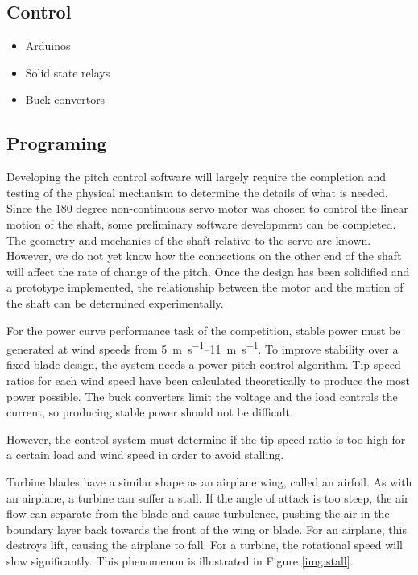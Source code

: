 \documentclass[11pt,letterpaper,conference]{IEEEtran}
\begin{document}
\subsection{Control}

\begin{itemize}
    \item Arduinos
    \item Solid state relays
    \item Buck convertors
\end{itemize}

\subsection{Programing}

Developing the pitch control software will largely require the completion and
testing of the physical mechanism to determine the details of what is needed.
Since the 180 degree non-continuous servo motor was chosen to control the
linear motion of the shaft, some preliminary software development can be
completed. The geometry and mechanics of the shaft relative to the servo are
known. However, we do not yet know how the connections on the other end of the
shaft will affect the rate of change of the pitch. Once the design has been
solidified and a prototype implemented, the relationship between the motor and
the motion of the shaft can be determined experimentally.

For the power curve performance task of the competition, stable power must be
generated at wind speeds from \qtyrange{5}{11}{\m\per\s}. To improve
stability over a fixed blade design, the system needs a power pitch control
algorithm. Tip speed ratios for each wind speed have been calculated
theoretically to produce the most power possible. The buck converters limit the
voltage and the load controls the current, so producing stable power should not
be difficult.



However, the control system
must determine if the tip speed ratio is too high for a certain load and wind
speed in order to avoid stalling.

Turbine blades have a similar shape as an airplane wing, called an airfoil. As
with an airplane, a turbine can suffer a stall. If the angle of attack is too
steep, the air flow can separate from the blade and cause turbulence, pushing
the air in the boundary layer back towards the front of the wing or blade. For
an airplane, this destroys lift, causing the airplane to fall. For a turbine,
the rotational speed will slow significantly. This phenomenon is illustrated in
Figure \ref{img:stall}.
\end{document}
